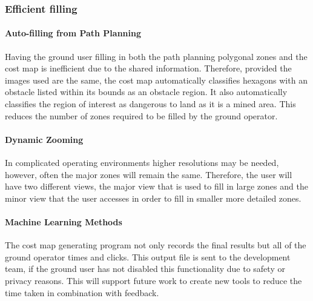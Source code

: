 \subsubsection{Efficient filling}
\paragraph{Auto-filling from Path Planning}
Having the ground user filling in both the path planning polygonal zones and the cost map is inefficient due to the shared information. Therefore, provided the images used are the same, the cost map automatically classifies hexagons with an obstacle listed within its bounds as an obstacle region. It also automatically classifies the region of interest as dangerous to land as it is a mined area. This reduces the number of zones required to be filled by the ground operator. 
\paragraph{Dynamic Zooming}
In complicated operating environments higher resolutions may be needed, however, often the major zones will remain the same. Therefore, the user will have two different views, the major view that is used to fill in large zones and the minor view that the user accesses in order to fill in smaller more detailed zones. 
\paragraph{Machine Learning Methods}
The cost map generating program not only records the final results but all of the ground operator times and clicks. This output file is sent to the development team, if the ground user has not disabled this functionality due to safety or privacy reasons. This will support future work to create new tools to reduce the time taken in combination with feedback.
